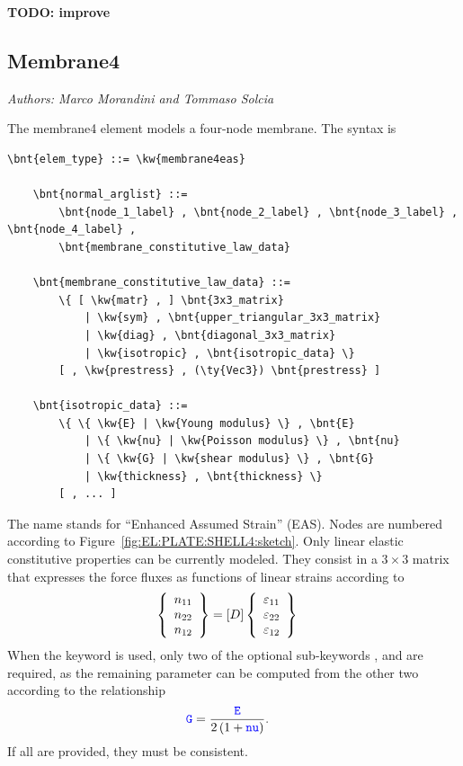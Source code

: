 \textbf{TODO: improve}



\subsection{Membrane4}
\label{sec:EL:PLATE:MEMBRANE4}

\emph{Authors: Marco Morandini and Tommaso Solcia}

The membrane4 element models a four-node membrane.
The syntax is
\begin{Verbatim}[commandchars=\\\{\}]
    \bnt{elem_type} ::= \kw{membrane4eas} 

    \bnt{normal_arglist} ::=
        \bnt{node_1_label} , \bnt{node_2_label} , \bnt{node_3_label} , \bnt{node_4_label} ,
        \bnt{membrane_constitutive_law_data}

    \bnt{membrane_constitutive_law_data} ::=
        \{ [ \kw{matr} , ] \bnt{3x3_matrix}
            | \kw{sym} , \bnt{upper_triangular_3x3_matrix}
            | \kw{diag} , \bnt{diagonal_3x3_matrix}
            | \kw{isotropic} , \bnt{isotropic_data} \}
        [ , \kw{prestress} , (\ty{Vec3}) \bnt{prestress} ]

    \bnt{isotropic_data} ::=
        \{ \{ \kw{E} | \kw{Young modulus} \} , \bnt{E}
            | \{ \kw{nu} | \kw{Poisson modulus} \} , \bnt{nu}
            | \{ \kw{G} | \kw{shear modulus} \} , \bnt{G}
            | \kw{thickness} , \bnt{thickness} \}
        [ , ... ]
\end{Verbatim}
The name  stands for ``Enhanced Assumed Strain'' (EAS).
Nodes are numbered according to Figure~\ref{fig:EL:PLATE:SHELL4:sketch}.
Only linear elastic constitutive properties can be currently modeled.
They consist in a $3 \times 3$ matrix that expresses the force
fluxes as functions of linear strains according to
\begin{align}
	\left\{ \begin{array}{c} 
		n_{11} \\
		n_{22} \\
		n_{12}
	 \end{array} \right\}
	&=
	\left[ D \right]
	\left\{ \begin{array}{c} 
		\varepsilon_{11} \\
		\varepsilon_{22} \\
		\varepsilon_{12}
	 \end{array} \right\}
\end{align}
When the  keyword is used, only two of the optional
sub-keywords ,  and  are required, as the remaining
parameter can be computed from the other two according to the relationship
\begin{align}
	\textcolor{blue}{\texttt{G}}
	&=
	\frac{\textcolor{blue}{\texttt{E}}}{2\left( 1 + \textcolor{blue}{\texttt{nu}} \right)}
	.
\end{align}
If all are provided, they must be consistent.


